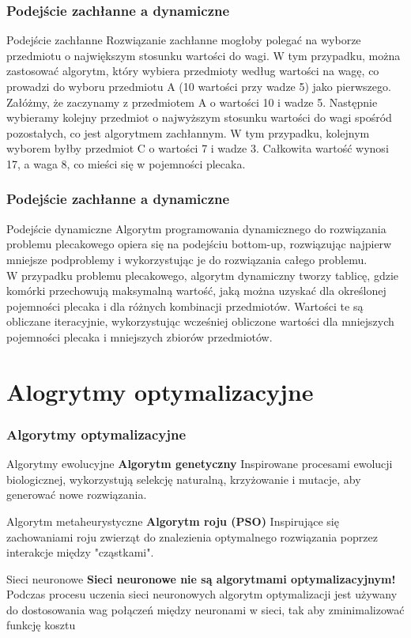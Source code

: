 \documentclass{beamer}
\begin{document}
\begin{frame}
    \frametitle{Podejście zachłanne a dynamiczne}
    \begin{block}{Podejście zachłanne}
        Rozwiązanie zachłanne mogłoby polegać na wyborze przedmiotu o największym stosunku wartości do wagi. W tym przypadku, można zastosować algorytm, który wybiera przedmioty według wartości na wagę, co prowadzi do wyboru przedmiotu A (10 wartości przy wadze 5) jako pierwszego.\\
Załóżmy, że zaczynamy z przedmiotem A o wartości 10 i wadze 5. Następnie wybieramy kolejny przedmiot o najwyższym stosunku wartości do wagi spośród pozostałych, co jest algorytmem zachłannym. W tym przypadku, kolejnym wyborem byłby przedmiot C o wartości 7 i wadze 3. Całkowita wartość wynosi 17, a waga 8, co mieści się w pojemności plecaka.
    \end{block}
\end{frame}

\begin{frame}
    \frametitle{Podejście zachłanne a dynamiczne}
    \begin{block}{Podejście dynamiczne}
        Algorytm programowania dynamicznego do rozwiązania problemu plecakowego opiera się na podejściu bottom-up, rozwiązując najpierw mniejsze podproblemy i wykorzystując je do rozwiązania całego problemu.\\
        W przypadku problemu plecakowego, algorytm dynamiczny tworzy tablicę, gdzie komórki przechowują maksymalną wartość, jaką można uzyskać dla określonej pojemności plecaka i dla różnych kombinacji przedmiotów. Wartości te są obliczane iteracyjnie, wykorzystując wcześniej obliczone wartości dla mniejszych pojemności plecaka i mniejszych zbiorów przedmiotów.
    \end{block}
\end{frame}

\section{Alogrytmy optymalizacyjne}
\begin{frame}
    \frametitle{Algorytmy optymalizacyjne}
    \begin{block}{Algorytmy ewolucyjne}
        \textbf{Algorytm genetyczny}
        Inspirowane procesami ewolucji biologicznej, wykorzystują selekcję naturalną, krzyżowanie i mutacje, aby generować nowe rozwiązania.
    \end{block}
    \begin{block}{Algorytm metaheurystyczne}
        \textbf{Algorytm roju (PSO)}
        Inspirujące się zachowaniami roju zwierząt do znalezienia optymalnego rozwiązania poprzez interakcje między "cząstkami".
    \end{block}
    \begin{alertblock}{Sieci neuronowe}
        \textbf{Sieci neuronowe nie są algorytmami optymalizacyjnym!} \\
        Podczas procesu uczenia sieci neuronowych algorytm optymalizacji jest używany do dostosowania wag połączeń między neuronami w sieci, tak aby zminimalizować funkcję kosztu
    \end{alertblock}
\end{frame}
\end{document}
